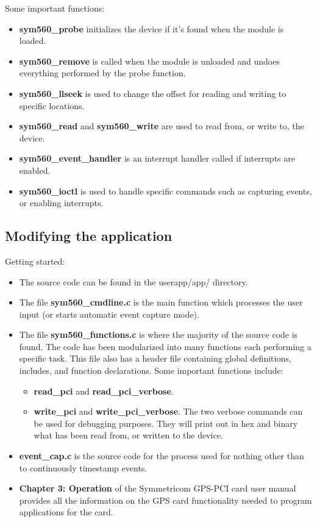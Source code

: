 \documentclass[11pt]{article}
\begin{document}
Some important functions:
\begin{itemize}
\item \textbf{sym560\_probe} initializes the device if it's found when the module is loaded.
\item \textbf{sym560\_remove} is called when the module is unloaded and undoes everything performed by the probe function.
\item \textbf{sym560\_llseek} is used to change the offset for reading and writing to specific locations.
\item \textbf{sym560\_read} and \textbf{sym560\_write} are used to read from, or write to, the device.
\item \textbf{sym560\_event\_handler} is an interrupt handler called if interrupts are enabled.
\item \textbf{sym560\_ioctl} is used to handle specific commands such as capturing events, or enabling interrupts.
\end{itemize}


\subsection{Modifying the application} \label{modapp}
Getting started:
\begin{itemize}
 \item The source code can be found in the userapp/app/ directory.
 \item The file \textbf{sym560\_cmdline.c} is the main function which processes the user input (or starts automatic event capture mode).
 \item The file \textbf{sym560\_functions.c} is where the majority of the source code is found.  The code has been modularized into many functions each performing a specific task.  This file also has a header file containing global definitions, includes, and function declarations.  Some important functions include:
\begin{itemize}
 \item \textbf{read\_pci} and \textbf{read\_pci\_verbose}.
 \item \textbf{write\_pci} and \textbf{write\_pci\_verbose}.  The two verbose commands can be used for debugging purposes.  They will print out in hex and binary what has been read from, or written to the device.
\end{itemize}
 \item \textbf{event\_cap.c} is the source code for the process used for nothing other than to continuously timestamp events.
 \item \textbf{Chapter 3: Operation} of the Symmetricom GPS-PCI card user manual provides all the information on the GPS card functionality needed to program applications for the card.
\end{itemize}
\end{document}
